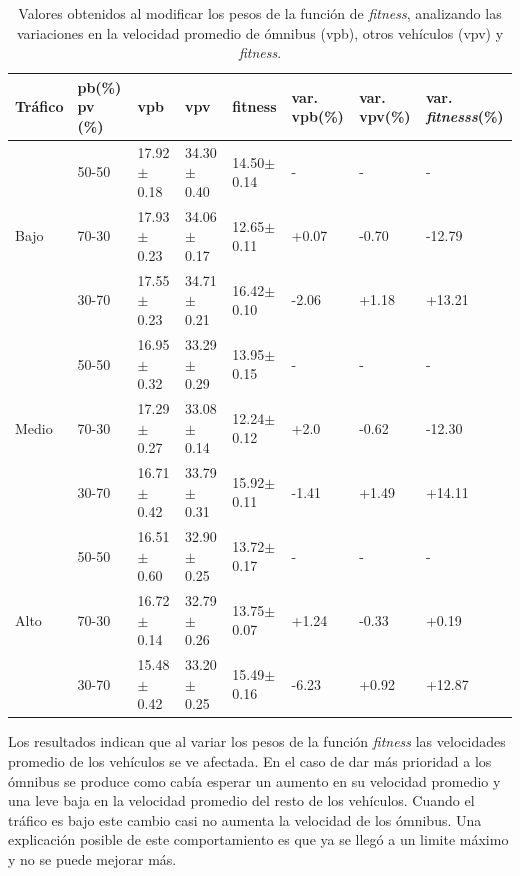 \begin{table}[H]
	\renewcommand{\arraystretch}{1.2}
	\caption[Valores obtenidos al modificar los pesos de la función de \emph{fitness}.]{Valores obtenidos al modificar los pesos de la función de \emph{fitness}, analizando las variaciones en la velocidad promedio de ómnibus (vpb), otros vehículos (vpv) y \emph{fitness}. }
	\label{table:analisis_fitness}
	\centering
	\begin{tabular}{p{1cm}p{1.2cm}p{1.8cm}p{1.8cm}p{1.8cm}p{1.2cm}p{1.2cm}p{1.2cm} }
		\hline
		Tráfico &
		pb(\%) pv (\%)& 
		vpb & 
		vpv &
		fitness &
		var. \newline vpb(\%) &
		var. \newline vpv(\%) &
		var. \newline \emph{fitnesss}(\%)
		\\ 
		\hline
		& 50-50  & 17.92$\pm$0.18 & 34.30$\pm$0.40 & 14.50$\pm$0.14  &- & - & -\\		
		Bajo & 70-30  & 17.93$\pm$0.23 & 34.06$\pm$0.17 & 12.65$\pm$0.11  & +0.07 & -0.70 & -12.79\\		
		& 30-70 & 17.55$\pm$0.23 & 34.71$\pm$0.21 & 16.42$\pm$0.10  & -2.06 & +1.18 & +13.21\\
		\hline
		
		& 50-50  & 16.95$\pm$0.32 & 33.29$\pm$0.29 & 13.95$\pm$0.15  &- & - & -\\		
		Medio & 70-30  & 17.29$\pm$0.27 & 33.08$\pm$0.14 & 12.24$\pm$0.12  & +2.0 & -0.62 & -12.30\\		
		& 30-70 & 16.71$\pm$0.42 & 33.79$\pm$0.31 & 15.92$\pm$0.11  & -1.41 & +1.49& +14.11\\
		
		\hline
		& 50-50  & 16.51$\pm$0.60 & 32.90$\pm$0.25 & 13.72$\pm$0.17  &- & - & -\\		
		Alto & 70-30  & 16.72$\pm$0.14 & 32.79$\pm$0.26 & 13.75$\pm$0.07  & +1.24 & -0.33 & +0.19\\	
		& 30-70 & 15.48$\pm$0.42 & 33.20$\pm$0.25 & 15.49$\pm$0.16  & -6.23 & +0.92 & +12.87\\
		\hline
	\end{tabular}
\end{table}


Los resultados indican que al variar los pesos de la función \emph{fitness} las velocidades promedio de los vehículos se ve afectada. En el caso de dar más prioridad a los ómnibus se produce como cabía esperar un aumento en su velocidad promedio y una leve baja en la velocidad promedio del resto de los vehículos. Cuando el tráfico es bajo este cambio casi no aumenta la velocidad de los ómnibus. Una explicación posible de este comportamiento es que ya se llegó a un limite máximo y no se puede mejorar más.


